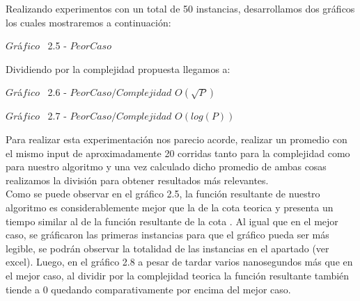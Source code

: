 Realizando experimentos con un total de 50 instancias, desarrollamos dos gr\'aficos los cuales mostraremos a continuaci\'on: \\

\vspace*{0.3cm} \vspace*{0.3cm}
  \begin{center}
 {$Gr$\'a$fico$ \ 2.5 - $Peor Caso$}
  \end{center}
  \vspace*{0.3cm}


Dividiendo por la complejidad propuesta llegamos a:\\

\vspace*{0.3cm} \vspace*{0.3cm}
  \begin{center}
 {$Gr$\'a$fico$ \ 2.6 - $Peor Caso / Complejidad$ $O(\sqrt{P})$}
  \end{center}
  \vspace*{0.3cm}

\vspace*{0.3cm} \vspace*{0.3cm}
  \begin{center}
 {$Gr$\'a$fico$ \ 2.7 - $Peor Caso / Complejidad$ $O(log(P))$}
  \end{center}
  \vspace*{0.3cm}

Para realizar esta experimentaci\'on nos parecio acorde, realizar un promedio con el mismo input de aproximadamente 20 corridas
tanto para la complejidad como para nuestro algoritmo y una vez calculado dicho promedio de ambas cosas realizamos la divisi\'on para
obtener resultados m\'as relevantes.\\ 

Como se puede observar en el gr\'afico 2.5, la funci\'on resultante de nuestro algoritmo es considerablemente mejor que la de la cota teorica  y presenta un tiempo similar al de la funci\'on resultante de la cota . Al igual que en el mejor caso, se gr\'aficaron las primeras instancias para que el gr\'afico pueda ser m\'as legible, se podr\'an observar la totalidad de las instancias en el apartado (ver excel).
Luego, en el gr\'afico 2.8 a pesar de tardar varios nanosegundos m\'as que en el mejor caso, al dividir por la complejidad teorica
la función resultante tambi\'en tiende a 0 quedando comparativamente por encima del mejor caso.\\

